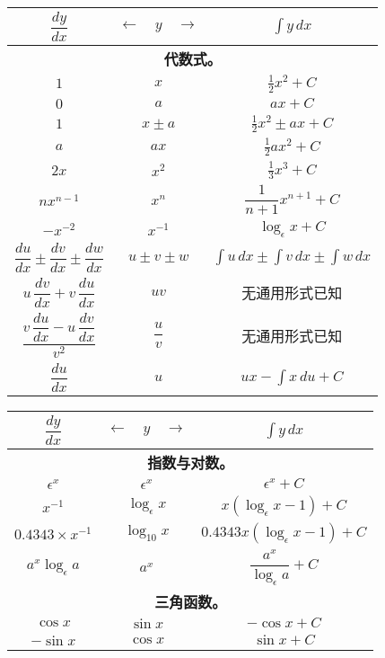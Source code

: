 \documentclass{ctexbook}
\newcommand{\ds}{\displaystyle}
\newcommand{\ColumnHead}[1]{%
  \multicolumn{3}{|c|}{\textbf{#1}}
}
\newcommand{\Pagelabel}[1]
  {\phantomsection\label{#1}}
\newcommand{\DStrut}{\rule[-12pt]{0pt}{32pt}}
\begin{document}
\vfil
\begin{center}
\Pagelabel{stdforms1}
\begin{tabular}{|c|c|c|}
\hline
\multicolumn{1}{|c}{\DStrut$\dfrac{dy}{dx}$}
  & \multicolumn{1}{c}{$\longleftarrow\quad y\quad\longrightarrow$}
  & $\ds\int y\, dx$ \\
\hline
\ColumnHead{代数式。} \\
\DStrut$1$ & $x$     & $\frac{1}{2} x^2 + C$ \\
\DStrut$0$ & $a$     & $ax + C $             \\
\DStrut$1$ & $x ± a$ & $\frac{1}{2} x^2 ± ax + C$ \\
\DStrut$a$ & $ax $   & $\frac{1}{2} ax^2 + C $\\
\DStrut$2x$ & $x^2$  & $\frac{1}{3} x^3 + C $ \\
\DStrut$nx^{n-1}$ & $x^n$ &$ \dfrac{1}{n+1} x^{n+1} + C $\\
\DStrut$-x^{-2} $ & $x^{-1}$ & $\log_\epsilon x + C$ \\
\DStrut$\dfrac{du}{dx} ± \dfrac{dv}{dx} ± \dfrac{dw}{dx}$
   & $u ± v ± w$     & $\int u\, dx ± \int v\, dx ± \int w\, dx$ \\
\DStrut$u\, \dfrac{dv}{dx} + v\, \dfrac{du}{dx}$
   & $uv$  & 无通用形式已知 \\
\DStrut$\dfrac{v\, \dfrac{du}{dx} - u\, \dfrac{dv}{dx}}{v^2}$
   & $\dfrac{u}{v}$ & 无通用形式已知 \\
\DStrut$\dfrac{du}{dx}$ & $u$ & $ux - \int x\, du + C$ \\
\hline
\end{tabular}
\vfil\newpage
\null\vfil
%
\begin{tabular}{|c|c|c|}
\hline
\multicolumn{1}{|c}{\DStrut$\dfrac{dy}{dx}$}
  & \multicolumn{1}{c}{$\longleftarrow\quad y\quad\longrightarrow$}
  & $\ds\int y\, dx$ \\
\hline
\ColumnHead{指数与对数。} \\
$\epsilon^x$ & $\epsilon^x$ & $\epsilon^x + C$ \\
$x^{-1}$     & $\log_\epsilon x$ & $ x(\log_\epsilon x - 1) + C$ \\
$0.4343 × x^{-1}$ & $\log_{10} x$ & $0.4343x (\log_\epsilon x - 1) + C$ \\
\DStrut$a^x \log_\epsilon a$ & $a^x$ & $\dfrac{a^x}{\log_\epsilon a} + C$ \\
\hline
%
\ColumnHead{三角函数。} \\
$\cos x$  & $\sin x$ & $-\cos x + C $ \\
$-\sin x$ & $\cos x$ & $\sin x + C $ \\

\end{tabular}
\end{center}
\end{document}
